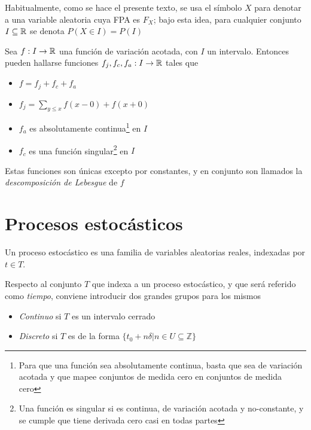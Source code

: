 Habitualmente, como se hace el presente texto, se usa el símbolo $X$ para denotar a una variable 
aleatoria cuya FPA es $F_X$; bajo esta idea, para cualquier conjunto $I \subseteq \mathbb{R}$ se denota
$P(X \in I) = P(I)$



\begin{teorema}
Sea $f:I\rightarrow \mathbb{R}$ una función de variación acotada, con $I$ un intervalo. Entonces pueden 
hallarse funciones $f_j, f_c, f_a :I\rightarrow \mathbb{R}$ tales que
\begin{itemize}
\item $f = f_j+ f_c+ f_a$
\item $f_j = \sum_{y \leq x} f(x-0) + f(x+0)$
\item $f_a$ es absolutamente continua\footnote{Para que una función sea absolutamente continua,
basta que sea de variación acotada y que mapee conjuntos de medida cero en conjuntos de medida
cero} en $I$
\item $f_c$ es una función singular\footnote{Una función es singular si es continua, de 
variación acotada y no-constante, y se cumple que tiene derivada cero casi en todas partes} en 
$I$
\end{itemize}
Estas funciones son únicas excepto por constantes, y en conjunto son llamados la 
\textit{descomposición de Lebesgue} de $f$
\label{Lebesgue_decomp}
\end{teorema}


\section{Procesos estocásticos}

\begin{definicion}
Un proceso estocástico \xt es una familia de variables aleatorias reales, 
indexadas por $t \in T$.
\label{proc_estocastico}
\end{definicion}

Respecto al conjunto $T$ que indexa a un proceso estocástico, y que será referido como 
\textit{tiempo}, conviene introducir dos grandes grupos para los mismos
\begin{itemize}
\item \textit{Continuo} si $T$ es un intervalo cerrado
\item \textit{Discreto} si $T$ es de la forma 
$\{ t_0 + n \delta \lvert n \in U \subseteq \mathbb{Z} \}$
\end{itemize}

